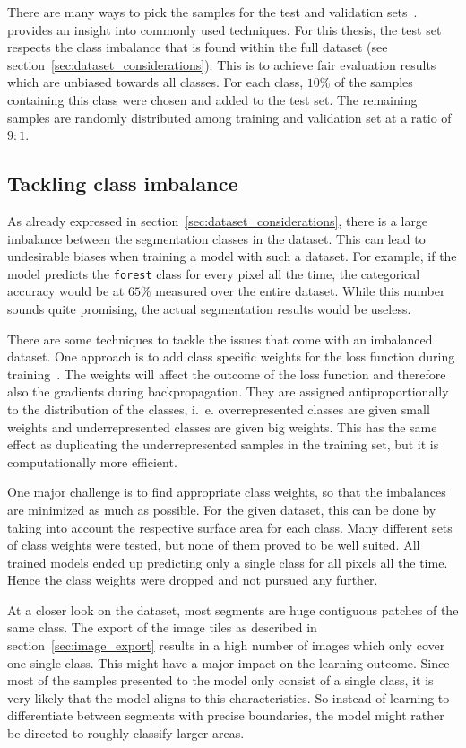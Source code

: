 There are many ways to pick the samples for the test and validation sets~\cite{val_split18}. provides an insight into commonly used techniques. For this thesis, the test set respects the class imbalance that is found within the full dataset (see section~\ref{sec:dataset_considerations}). This is to achieve fair evaluation results which are unbiased towards all classes. For each class, $10\%$ of the samples containing this class were chosen and added to the test set. The remaining samples are randomly distributed among training and validation set at a ratio of $9:1$.

\subsection{Tackling class imbalance}
\label{sec:class_imbalance}

As already expressed in section~\ref{sec:dataset_considerations}, there is a large imbalance between the segmentation classes in the dataset. This can lead to undesirable biases when training a model with such a dataset. For example, if the model predicts the \texttt{forest} class for every pixel all the time, the categorical accuracy would be at $65\%$ measured over the entire dataset. While this number sounds quite promising, the actual segmentation results would be useless.

There are some techniques to tackle the issues that come with an imbalanced dataset. One approach is to add class specific weights for the loss function during training~\cite{class_imbalance19}. The weights will affect the outcome of the loss function and therefore also the gradients during backpropagation. They are assigned antiproportionally to the distribution of the classes, i.~e. overrepresented classes are given small weights and underrepresented classes are given big weights. This has the same effect as duplicating the underrepresented samples in the training set, but it is computationally more efficient.

One major challenge is to find appropriate class weights, so that the imbalances are minimized as much as possible. For the given dataset, this can be done by taking into account the respective surface area for each class. Many different sets of class weights were tested, but none of them proved to be well suited. All trained models ended up predicting only a single class for all pixels all the time. Hence the class weights were dropped and not pursued any further.

At a closer look on the dataset, most segments are huge contiguous patches of the same class. The export of the image tiles as described in section~\ref{sec:image_export} results in a high number of images which only cover one single class. This might have a major impact on the learning outcome. Since most of the samples presented to the model only consist of a single class, it is very likely that the model aligns to this characteristics. So instead of learning to differentiate between segments with precise boundaries, the model might rather be directed to roughly classify larger areas.

